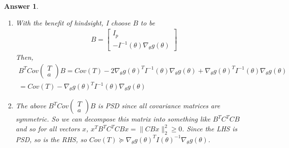 \documentclass[12pt]{article}
\theoremstyle{colon}
\newtheorem*{answer}{Answer}
\begin{document}
\begin{answer}
\begin{enumerate}[label=\arabic*)]
\begin{gather*}
        \mathbb{E}[a a^T] = \mathbb{E}[\nabla_\theta \log f_\theta(x) (\nabla_\theta \log f_\theta(x))^T] = I(\theta) \\
        \mathbb{E}[T T^T] - \mathbb{E}[T]\mathbb{E}[T]^T = Cov(T) \\
        \mathbb{E}[T a^T] = \int T(x) \frac{\nabla_\theta f_\theta(x)}{f_\theta(x)}f_\theta(x) dx \\
        \mathbb{E}[T a^T] = \nabla_\theta \int T(x) f_\theta(x) dx = \nabla_\theta g(\theta)
      \end{gather*}
      Finally,
      \begin{gather*}
        Cov((T,a)^T) = \begin{bmatrix}
          Cov(T) && \nabla_\theta g(\theta) \\
          \nabla_\theta g(\theta)^T && I(\theta)
        \end{bmatrix}
      \end{gather*}
    \item With the benefit of hindsight, I choose $B$ to be
      \begin{gather*}
        B = \begin{bmatrix}
          I_p \\
          -I^{-1}(\theta) \nabla_\theta g(\theta)
        \end{bmatrix}
      \end{gather*}
      Then,
      \begin{gather*}
        B^T Cov \begin{pmatrix} T \\ a \end{pmatrix} B = Cov(T) -2 \nabla_\theta g(\theta)^T I^{-1}(\theta) \nabla_\theta g(\theta) + \nabla_\theta g(\theta)^T I^{-1}(\theta) \nabla_\theta g(\theta) \\
        = Cov(T) - \nabla_\theta g(\theta)^T I^{-1}(\theta) \nabla_\theta g(\theta)
      \end{gather*}
    \item The above $B^T Cov \begin{pmatrix} T \\ a \end{pmatrix} B$ is PSD since all covariance matrices are symmetric. So we can decompose this matrix into something like $B^T C^T C B$ and so for all vectors $x$, $x^T B^T C^T C B x = \lVert CBx \rVert_2^2 \geq 0$. Since the LHS is PSD, so is the RHS, so $Cov(T) \succeq \nabla_\theta g(\theta)^T I(\theta)^{-1} \nabla_\theta g(\theta)$.
  \end{enumerate}
\end{answer}
\end{document}
